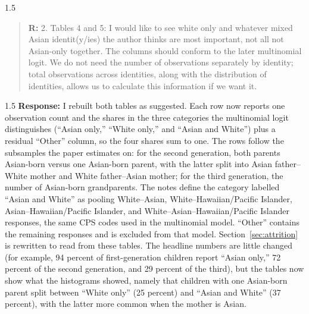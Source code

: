 \documentclass[12pt,english]{article}
\newcommand{\rrxspc}{1.5}
\begin{document}
\begin{refsection}
    \begin{spacing}{\rrxspc}
            \begin{quotation}
                \textbf{R: } 2. Tables 4 and 5: I would like to see white only and whatever mixed Asian identit(y/ies) the author thinks are most important, not all not Asian-only together. The columns should conform to the later multinomial logit. We do not need the number of observations separately by identity; total observations across identities, along with the distribution of identities, allows us to calculate this information if we want it.
            \end{quotation}
    \end{spacing}
    \begin{spacing}{\rrxspc}
        \textbf{Response:} I rebuilt both tables as suggested. Each row now reports one observation count and the shares in the three categories the multinomial logit distinguishes (``Asian only,'' ``White only,'' and ``Asian and White'') plus a residual ``Other'' column, so the four shares sum to one. The rows follow the subsamples the paper estimates on: for the second generation, both parents Asian-born versus one Asian-born parent, with the latter split into Asian father--White mother and White father--Asian mother; for the third generation, the number of Asian-born grandparents. The notes define the category labelled ``Asian and White'' as pooling White--Asian, White--Hawaiian/Pacific Islander, Asian--Hawaiian/Pacific Islander, and White--Asian--Hawaiian/Pacific Islander responses, the same CPS codes used in the multinomial model. ``Other'' contains the remaining responses and is excluded from that model. Section~\ref{sec:attrition} is rewritten to read from these tables. The headline numbers are little changed (for example, 94 percent of first-generation children report ``Asian only,'' 72 percent of the second generation, and 29 percent of the third), but the tables now show what the histograms showed, namely that children with one Asian-born parent split between ``White only'' (25 percent) and ``Asian and White'' (37 percent), with the latter more common when the mother is Asian.
    \end{spacing}


\end{refsection}
\end{document}
